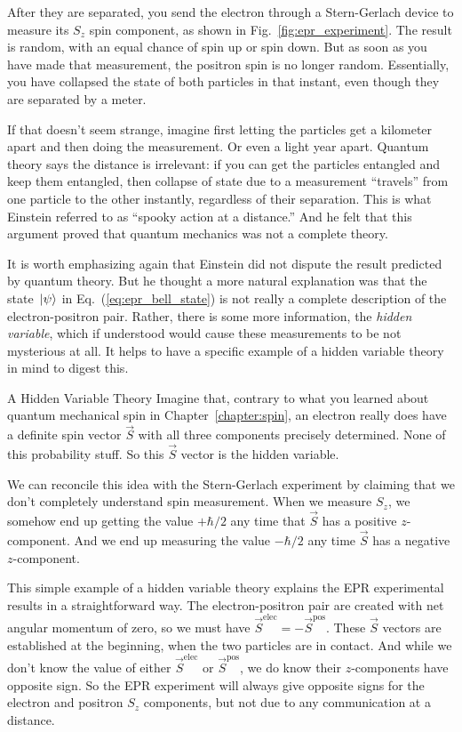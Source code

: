 After they are separated, you send the electron through a
Stern-Gerlach device to measure its $S_z$ spin component, as shown in
Fig.~\ref{fig:epr_experiment}.  The result is random, with an equal
chance of spin up or spin down.  But as soon as you have made that
measurement, the positron spin is no longer random.  Essentially, you
have collapsed the state of both particles in that instant, even
though they are separated by a meter.

If that doesn't seem strange, imagine first letting the particles get
a kilometer apart and then doing the measurement.  Or even a light
year apart.  Quantum theory says the distance is irrelevant: if you
can get the particles entangled and keep them entangled, then collapse
of state due to a measurement ``travels'' from one particle to the
other instantly, regardless of their separation.  This is what
Einstein referred to as ``spooky action at a distance.''  And he felt
that this argument proved that quantum mechanics was not a complete
theory.

It is worth emphasizing again that Einstein did not dispute the result
predicted by quantum theory.  But he thought a more natural
explanation was that the state $\,|\mbox{$\psi$}\rangle$ in
Eq.~(\ref{eq:epr_bell_state}) is not really a complete description of
the electron-positron pair.  Rather, there is some more information,
the \textit{hidden variable}, which if understood would cause these
measurements to be not mysterious at all.  It helps to have a specific
example of a hidden variable theory in mind to digest this.

\begin{example}{A Hidden Variable Theory}
Imagine that, contrary to what you learned about quantum mechanical
spin in Chapter~\ref{chapter:spin}, an electron really does have a
definite spin vector $\vec S$ with all three components precisely
determined.  None of this probability stuff.  So this $\vec S$ vector
is the hidden variable.  

We can reconcile this idea with the Stern-Gerlach experiment by
claiming that we don't completely understand spin measurement.  When
we measure $S_z$, we somehow end up getting the value $+\hbar/2$ any
time that $\vec S$ has a positive $z$-component.  And we end up
measuring the value $-\hbar/2$ any time $\vec S$ has a negative
$z$-component.
\label{example:hidden_variable_theory}
\end{example}

This simple example of a hidden variable theory explains the EPR
experimental results in a straightforward way.  The electron-positron
pair are created with net angular momentum of zero, so we must have
$\vec S^\text{elec} = -\vec S^\text{pos}$.  These $\vec S$ vectors are
established at the beginning, when the two particles are in contact.
And while we don't know the value of
either $\vec S^\text{elec}$ or $\vec S^\text{pos}$,
we do know their $z$-components have
opposite sign.  So the EPR experiment will always give opposite signs
for the electron and positron $S_z$ components, but not due to any
communication at a distance.  

